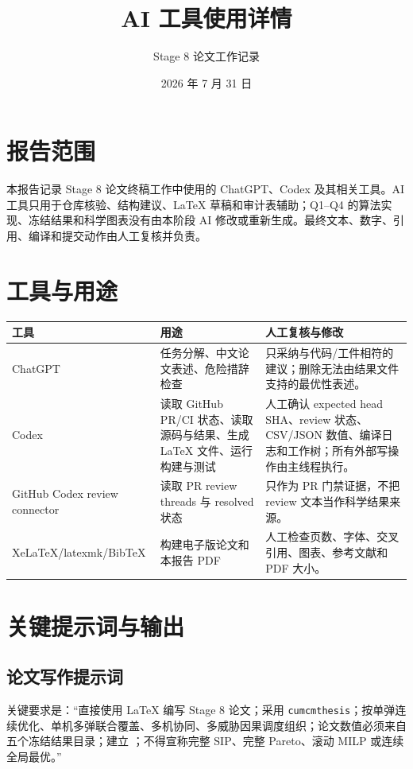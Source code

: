 \documentclass[UTF8,a4paper,12pt]{ctexart}
\title{AI 工具使用详情}
\author{Stage 8 论文工作记录}
\date{2026 年 7 月 31 日}
\begin{document}
\maketitle

\section{报告范围}

本报告记录 Stage 8 论文终稿工作中使用的 ChatGPT、Codex 及其相关工具。AI 工具只用于仓库核验、结构建议、LaTeX 草稿和审计表辅助；Q1--Q4 的算法实现、冻结结果和科学图表没有由本阶段 AI 修改或重新生成。最终文本、数字、引用、编译和提交动作由人工复核并负责。

\section{工具与用途}

\begin{longtable}{p{}p{}p{}}
\toprule
工具 & 用途 & 人工复核与修改 \\
\midrule
ChatGPT & 任务分解、中文论文表述、危险措辞检查 & 只采纳与代码/工件相符的建议；删除无法由结果文件支持的最优性表述。 \\
Codex & 读取 GitHub PR/CI 状态、读取源码与结果、生成 LaTeX 文件、运行构建与测试 & 人工确认 expected head SHA、review 状态、CSV/JSON 数值、编译日志和工作树；所有外部写操作由主线程执行。 \\
GitHub Codex review connector & 读取 PR review threads 与 resolved 状态 & 只作为 PR 门禁证据，不把 review 文本当作科学结果来源。 \\
XeLaTeX/latexmk/BibTeX & 构建电子版论文和本报告 PDF & 人工检查页数、字体、交叉引用、图表、参考文献和 PDF 大小。 \\
\bottomrule
\end{longtable}

\section{关键提示词与输出}

\subsection{论文写作提示词}

关键要求是：“直接使用 LaTeX 编写 Stage 8 论文；采用 \texttt{cumcmthesis}；按单弹连续优化、单机多弹联合覆盖、多机协同、多威胁因果调度组织；论文数值必须来自五个冻结结果目录；建立 ；不得宣称完整 SIP、完整 Pareto、滚动 MILP 或连续全局最优。”
\end{document}
